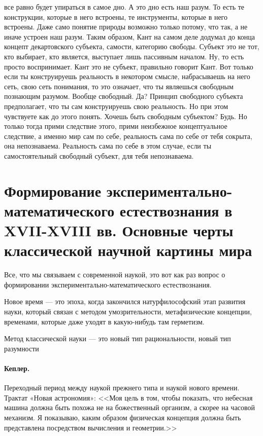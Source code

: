 все равно будет упираться в самое дно. А это дно есть наш разум. То есть те
конструкции, которые в него встроены, те инструменты, которые в него встроены.
Даже само понятие природы возможно только потому, что так, а не иначе устроен
наш разум. Таким образом, Кант на самом деле додумал до конца концепт
декартовского субъекта, самости, категорию свободы. Субъект это не тот, кто
выбирает, кто является, выступает лишь пассивным началом. Ну, то есть просто
воспринимает. Кант это не субъект, правильно говорит Кант. Вот только если ты
конструируешь реальность в некотором смысле, набрасываешь на него сеть, свою
сеть понимания, то это означает, что ты являешься свободным познающим разумом.
Вообще свободный. Да? Принцип свободного субъекта предполагает, что ты сам
конструируешь свою реальность. Но при этом чувствуете как до этого понять.
Хочешь быть свободным субъектом? Будь. Но только тогда прими следствие этого,
прими неизбежное концептуальное следствие, а именно мир сам по себе, реальность
сама по себе от тебя сокрыта, она непознаваема. Реальность сама по себе в этом
случае, если ты самостоятельный свободный субъект, для тебя непознаваема. 


\section{Формирование экспериментально-математического естествознания в XVII-XVIII вв.
Основные черты классической научной картины мира} 

Все,
что мы связываем с современной наукой, это вот как раз вопрос о формировании
экспериментально-математического естествознания. 

Новое
время --- это эпоха, когда закончился натурфилософский этап развития
науки, который связан с методом умозрительности,
метафизические концепции, временами, которые даже уходят в какую-нибудь там
герметизм. 

Метод классической науки --- это новый тип рациональности, новый
тип разумности

\paragraph{Кеплер.} Переходный период между наукой прежнего
типа и наукой нового времени. Трактат «Новая астрономия»: <<Моя цель в том, чтобы
показать, что небесная машина должна быть похожа не на божественный организм, а
скорее на часовой механизм. Я показываю, каким образом физическая концепция
должна быть представлена посредством вычисления и геометрии.>> 

